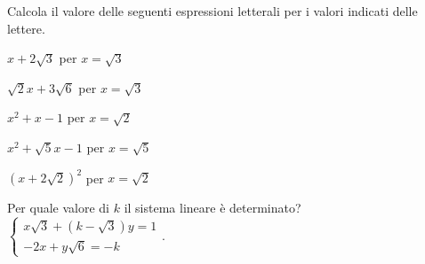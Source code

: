 \begin{esercizio}%
Calcola il valore delle seguenti espressioni letterali per i valori indicati 
delle lettere.
\begin{multicols}{3}
\begin{enumeratea}
\item $x+2\sqrt 3$ per $x=\sqrt 3$
\item $\sqrt 2x+3\sqrt 6$ per $x=\sqrt{3}$
\item $x^2+x-1$ per $x=\sqrt 2$
\item $x^2+\sqrt 5x-1$ per $x=\sqrt 5$
\item $(x+2\sqrt 2)^2$ per $x=\sqrt 2$
\end{enumeratea}
\end{multicols}
\end{esercizio}



\begin{esercizio}%
Per quale valore di $k$ il sistema lineare è determinato?
$\left\{\begin{array}{l}{x\sqrt 3+(k-\sqrt 3)y=1}\\
 {-2x+y\sqrt 6=-k} \end{array}\right..$
\end{esercizio}


